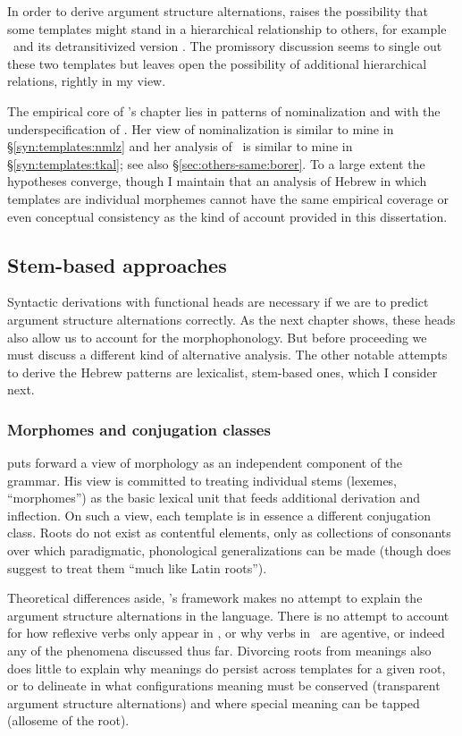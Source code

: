 In order to derive argument structure alternations, \citet[564]{borer13oup} raises the possibility that some templates might stand in a hierarchical relationship to others, for example \tpie~and its detransitivized version \thit. The promissory discussion seems to single out these two templates but leaves open the possibility of additional hierarchical relations, rightly in my view. 

The empirical core of \citeauthor{borer13oup}'s chapter lies in patterns of nominalization and with the underspecification of \tkal. Her view of nominalization is similar to mine in \S\ref{syn:templates:nmlz} and her analysis of \tkal~is similar to mine in \S\ref{syn:templates:tkal}; see also \S\ref{sec:others-same:borer}. To a large extent the hypotheses converge, though I maintain that an analysis of Hebrew in which templates are individual morphemes cannot have the same empirical coverage or even conceptual consistency as the kind of account provided in this dissertation.


	\subsection{Stem-based approaches}\label{syn:other-stem}
Syntactic derivations with functional heads are necessary if we are to predict argument structure alternations correctly. As the next chapter shows, these heads also allow us to account for the morphophonology. But before proceeding we must discuss a different kind of alternative analysis. The other notable attempts to derive the Hebrew patterns are lexicalist, stem-based ones, which I consider next.

		\subsubsection{Morphomes and conjugation classes \citep{aronoff94,aronoff07}}
\cite{aronoff94,aronoff07} puts forward a view of morphology as an independent component of the grammar. His view is committed to treating individual stems (lexemes, ``morphomes'') as the basic lexical unit that feeds additional derivation and inflection. On such a view, each template is in essence a different conjugation class. Roots do not exist as contentful elements, only as collections of consonants over which paradigmatic, phonological generalizations can be made (though \citealt[827]{aronoff07} does suggest to treat them ``much like Latin roots'').

Theoretical differences aside, \citeauthor{aronoff94}'s framework makes no attempt to explain the argument structure alternations in the language. There is no attempt to account for how reflexive verbs only appear in \thit, or why verbs in \tpie~are agentive, or indeed any of the phenomena discussed thus far. Divorcing roots from meanings also does little to explain why meanings do persist across templates for a given root, or to delineate in what configurations meaning must be conserved (transparent argument structure alternations) and where special meaning can be tapped (alloseme of the root).
	
